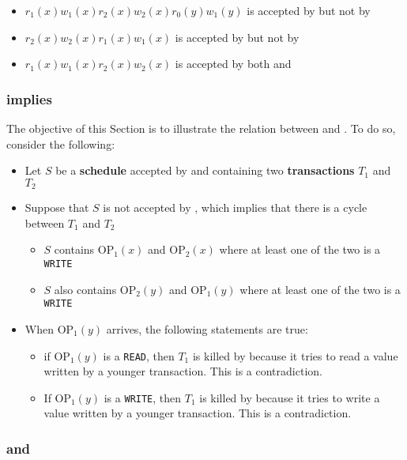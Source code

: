 \documentclass[english]{article}
\begin{document}
\begin{itemize}
  \item \(r_1(x) w_1(x) r_2(x) w_2(x) r_0(y) w_1(y)\) is accepted by \ts but not by \tpl
  \item \(r_2(x) w_2(x) r_1(x) w_1(x)\) is accepted by \tpl but not by \ts
  \item \(r_1(x) w_1(x) r_2(x) w_2(x)\) is accepted by both \ts and \tpl
\end{itemize}

\subsubsection{\ts implies \csr}

The objective of this Section is to illustrate the relation between \ts and \csr.
To do so, consider the following:

\begin{itemize}
  \item Let \(S\) be a \textbf{schedule} accepted by \ts and containing two \textbf{transactions} \(T_1\) and \(T_2\)
  \item Suppose that \(S\) is not accepted by \csr, which implies that there is a cycle between \(T_1\) and \(T_2\)
        \begin{itemize}
          \item \(S\) contains \(\text{OP}_1(x)\) and \(\text{OP}_2(x)\) where at least one of the two is a \texttt{WRITE}
          \item \(S\) also contains \(\text{OP}_2(y)\) and \(\text{OP}_1(y)\) where at least one of the two is a \texttt{WRITE}
        \end{itemize}
  \item When \(\text{OP}_1(y)\) arrives, the following statements are true:
        \begin{itemize}
          \item if \(\text{OP}_1(y)\) is a \texttt{READ}, then \(T_1\) is killed by \ts because it tries to read a value written by a younger transaction. This is a contradiction.
          \item If \(\text{OP}_1(y)\) is a \texttt{WRITE}, then \(T_1\) is killed by \ts because it tries to write a value written by a younger transaction. This is a contradiction.
        \end{itemize}
\end{itemize}

\subsubsection{\tpl and \ts}
\end{document}

